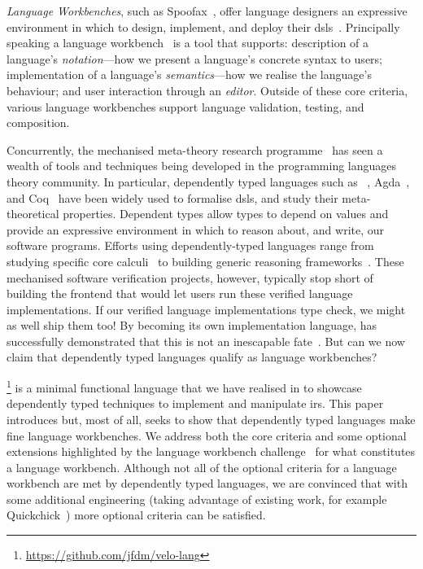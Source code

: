 \emph{Language Workbenches}, such as
Spoofax~\cite{DBLP:journals/software/WachsmuthKV14},
offer language designers an expressive environment in which to design,
implement, and deploy their \Acp{dsl}~\cite{hudak1996building}.
%
Principally speaking a language workbench~\cite{DBLP:conf/sle/ErdwegSVBBCGHKLKMPPSSSVVVWW13}
is a tool that supports:
description of a language's \emph{notation}---how we present a language's concrete syntax to users;
implementation of a language's \emph{semantics}---how we realise the language's behaviour;
and user interaction through an \emph{editor}.
%
Outside of these core criteria, various language workbenches
support language validation, testing, and composition.


Concurrently, the mechanised meta-theory research
programme~\cite{DBLP:conf/tphol/AydemirBFFPSVWWZ05,DBLP:journals/jfp/AbelAHPMSS19}
has seen a wealth of tools and techniques being developed
in the programming languages theory community.
%
In particular, dependently typed languages such as
\Idris{}~\cite{DBLP:conf/ecoop/Brady21},
Agda~\cite{DBLP:conf/afp/Norell08},
and Coq~\cite{the_coq_development_team_2022_5846982}
have been widely used to formalise \acp{dsl}, and study their
meta-theoretical properties.
%
Dependent types allow types to depend on values and provide an expressive environment in which to reason about, and write, our software programs.
%
Efforts using dependently-typed languages range from
studying specific core calculi~\cite{10.1145/3093333.3009866,DBLP:conf/cpp/RouvoetPKV20,DBLP:conf/mpc/ChapmanKNW19}
to building generic reasoning frameworks~\cite{DBLP:conf/cpp/StarkSK19,DBLP:journals/jfp/AllaisACMM21}.
%
These mechanised software verification projects, however, typically stop short
of building the frontend that would let users run these verified
language implementations.
If our verified language implementations type check, we might as well ship them too!
%
By becoming its own implementation language, \Idris{} has successfully
demonstrated that this is not an inescapable fate~\cite{DBLP:conf/ecoop/Brady21}.
%
But can we now claim that dependently typed languages qualify as
language workbenches?

\Velo{}\footnote{\url{https://github.com/jfdm/velo-lang}} is a minimal functional language that we have realised in \Idris{}
to showcase dependently typed techniques to implement and manipulate \acp{ir}.
%
This paper introduces \Velo{} but, most of all, seeks to show that
dependently typed languages make fine language workbenches.
%
We address both the core criteria and some optional extensions
highlighted by the language workbench challenge~\cite{DBLP:conf/sle/ErdwegSVBBCGHKLKMPPSSSVVVWW13} for what constitutes a language workbench.
%
%
Although not all of the optional criteria for a language workbench are met by dependently typed languages, we are convinced that with some additional engineering (taking advantage of existing work, for example Quickchick~\cite{DBLP:journals/pacmpl/LampropoulosPP18}) more optional criteria can be satisfied.


